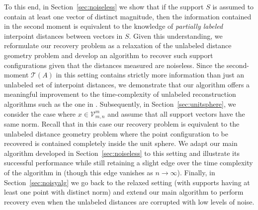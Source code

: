 \documentclass{article}
\theoremstyle{definition}
\renewcommand{\|}{|}
\renewcommand{\t}{\mathcal{T}}
\newcommand{\V}{\mathcal{V}}
\newcommand{\arun}[1]{{\color{cyan} #1}}
\begin{document}
To this end, in Section~\ref{sec:noiseless} we show that if the support $S$ is assumed to contain at least one vector of distinct magnitude, then the information contained in the second moment is equivalent to the knowledge of \textit{partially labeled} interpoint distances between vectors in $S$. Given this understanding, we reformulate our recovery problem as a relaxation of the unlabeled distance geometry problem and develop an algorithm to recover such support configurations given that the distances measured are noiseless. Since the second-moment $\t(A)$ in this setting contains strictly more information than just an unlabeled set of interpoint distances, we demonstrate that our algorithm offers a meaningful improvement to the time-complexity of unlabeled reconstruction algorithms such as the one in \cite{duxbury2016unassigned}. Subsequently, in Section~\ref{sec:unitsphere}, we consider the case where $x\in \V_{m,n}^m$ and assume that all support vectors have the same norm. Recall that in this case our recovery problem is equivalent to the unlabeled distance geometry problem where the point configuration to be recovered is contained completely inside the unit sphere. We adapt our main algorithm developed in Section~\ref{sec:noiseless} to this setting and illustrate its successful performance while still retaining a slight edge over the time complexity of the algorithm in \cite{duxbury2016unassigned} (though this edge vanishes as $n\to \infty$). Finally, in Section~\ref{sec:noisyalg} we go back to the relaxed setting (with supports having at least one point with distinct norm) and extend our main algorithm to perform recovery even when the unlabeled distances are corrupted with low levels of noise. \\

\end{document}
